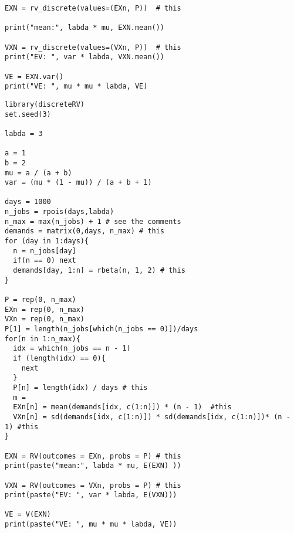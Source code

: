\begin{exercise}
\begin{verbatim}
EXN = rv_discrete(values=(EXn, P))  # this

print("mean:", labda * mu, EXN.mean())

VXN = rv_discrete(values=(VXn, P))  # this
print("EV: ", var * labda, VXN.mean())

VE = EXN.var()
print("VE: ", mu * mu * labda, VE)
\end{verbatim}


\begin{verbatim}
library(discreteRV)
set.seed(3)

labda = 3

a = 1
b = 2
mu = a / (a + b)
var = (mu * (1 - mu)) / (a + b + 1)

days = 1000
n_jobs = rpois(days,labda)
n_max = max(n_jobs) + 1 # see the comments
demands = matrix(0,days, n_max) # this
for (day in 1:days){
  n = n_jobs[day]
  if(n == 0) next
  demands[day, 1:n] = rbeta(n, 1, 2) # this
}

P = rep(0, n_max)
EXn = rep(0, n_max)
VXn = rep(0, n_max)
P[1] = length(n_jobs[which(n_jobs == 0)])/days
for(n in 1:n_max){
  idx = which(n_jobs == n - 1)
  if (length(idx) == 0){
    next
  }
  P[n] = length(idx) / days # this
  m =
  EXn[n] = mean(demands[idx, c(1:n)]) * (n - 1)  #this
  VXn[n] = sd(demands[idx, c(1:n)]) * sd(demands[idx, c(1:n)])* (n - 1) #this
}

EXN = RV(outcomes = EXn, probs = P) # this
print(paste("mean:", labda * mu, E(EXN) ))

VXN = RV(outcomes = VXn, probs = P) # this
print(paste("EV: ", var * labda, E(VXN)))

VE = V(EXN)
print(paste("VE: ", mu * mu * labda, VE))
\end{verbatim}

\end{exercise}


